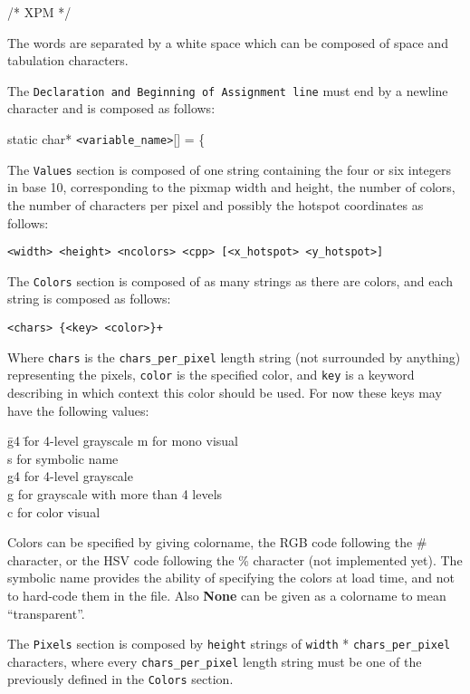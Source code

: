 /* XPM */

The words are separated by a white space which can be composed of space and
tabulation characters.  

The {\tt Declaration and Beginning of Assignment line} must end
by a newline character and is composed as follows:

static char* {\tt <variable\_name>}[] = \{

The {\tt Values} section is composed of one string containing the four or six
integers in base 10, corresponding to the pixmap width and height, the number
of colors, the number of characters per pixel and possibly the hotspot
coordinates as follows:

{\tt <width> <height> <ncolors> <cpp> [<x\_hotspot> <y\_hotspot>]}

The {\tt Colors} section is composed of as many strings as there are colors,
and each string is composed as follows:

{\tt <chars> \{<key> <color>\}+}

Where {\tt chars} is the {\tt chars\_per\_pixel} length string (not surrounded
by anything) representing the pixels, {\tt color} is the specified color, and
{\tt key} is a keyword describing in which context this color should be used.
For now these keys may have the following values:

\begin{tabbing}
\hspace{1cm}\= g4 \= for 4-level grayscale\kill
\> m  \>for mono visual\\
\> s  \> for symbolic name\\
\> g4 \> for 4-level grayscale\\
\> g  \> for grayscale with more than 4 levels\\
\> c  \> for color visual
\end{tabbing}

Colors can be specified by giving colorname, the RGB code following the \#
character, or the HSV code following the \% character (not implemented yet).
The symbolic name provides the ability of specifying the colors at load
time, and not to hard-code them in the file. Also {\bf None} can be given as a
colorname to mean ``transparent''.

The {\tt Pixels} section is composed by {\tt height} strings of {\tt width} *
{\tt chars\_per\_pixel} characters, where every {\tt chars\_per\_pixel} length
string must be one of the previously defined in the {\tt Colors} section.

